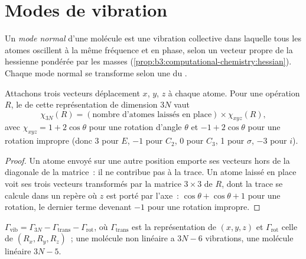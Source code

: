 \section{Modes de vibration}

\begin{definition}\label{def:b3:group-theory-applied:normal-mode}
Un \emph{mode normal} d'une molécule est une vibration
collective dans laquelle tous les atomes oscillent à la même fréquence et
en phase, selon un vecteur propre de la hessienne pondérée par les masses
(\cref{prop:b3:computational-chemistry:hessian}). Chaque mode normal se
transforme selon une  du .
\end{definition}

\begin{proposition}\label{prop:b3:group-theory-applied:gamma-3n}
Attachons trois vecteurs déplacement $x$, $y$, $z$ à chaque atome. Pour
une opération
$R$, le  de cette représentation de dimension $3N$ vaut
\[
\chi_{3N}(R) = (\text{nombre d'atomes laissés en place}) \times \chi_{xyz}(R),
\]
avec $\chi_{xyz} = 1 + 2\cos\theta$ pour une rotation d'angle $\theta$ et
$-1 + 2\cos\theta$
pour une rotation impropre (donc 3 pour $E$, $-1$ pour $C_2$, 0 pour
$C_3$, 1 pour $\sigma$,
$-3$ pour $i$).
\end{proposition}

\begin{proof}
Un atome envoyé sur une autre position emporte ses vecteurs hors de la
diagonale de la matrice~: il ne contribue pas à la trace. Un atome laissé
en place voit ses trois vecteurs transformés par la matrice $3\times3$ de
$R$, dont la trace se calcule dans un repère où $z$ est porté par
l'axe~: $\cos\theta + \cos\theta + 1$ pour une rotation, le dernier terme
devenant $-1$ pour une rotation impropre.
\end{proof}

\begin{proposition}\label{prop:b3:group-theory-applied:mode-count}
$\Gamma_{\mathrm{vib}} = \Gamma_{3N} - \Gamma_{\mathrm{trans}} - \Gamma_{\mathrm{rot}}$, où
$\Gamma_{\mathrm{trans}}$ est la représentation de $(x, y, z)$ et $\Gamma_{\mathrm{rot}}$ celle
de $(R_x, R_y, R_z)$~; une molécule non linéaire a $3N - 6$ vibrations,
une molécule linéaire $3N - 5$.
\end{proposition}

